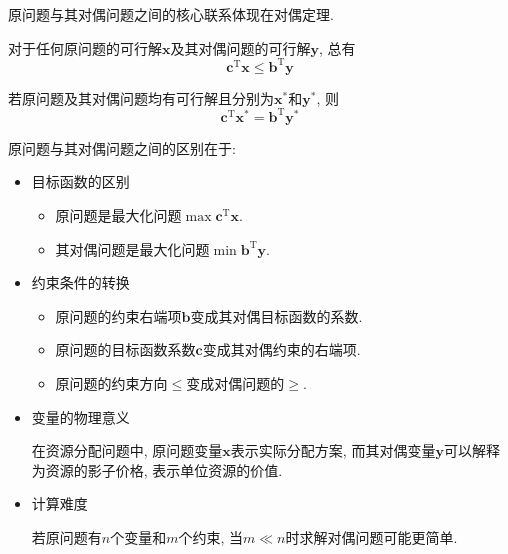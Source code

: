 原问题与其对偶问题之间的核心联系体现在对偶定理.

\begin{theorem}[弱对偶定理]
    对于任何原问题的可行解$\bm{x}$及其对偶问题的可行解$\bm{y}$, 总有
    \begin{equation*}
        \bm{c}^\mathrm{T}\bm{x}\leq\bm{b}^\mathrm{T}\bm{y}
    \end{equation*}
\end{theorem}

\begin{theorem}[强对偶定理]
    若原问题及其对偶问题均有可行解且分别为$\bm{x}^*$和$\bm{y}^*$, 则
    \begin{equation*}
        \bm{c}^\mathrm{T}\bm{x}^*=\bm{b}^\mathrm{T}\bm{y}^*
    \end{equation*}
\end{theorem}

原问题与其对偶问题之间的区别在于:
\begin{itemize}
    \item
        目标函数的区别
        \begin{itemize}
            \item 原问题是最大化问题$\max\bm{c}^\mathrm{T}\bm{x}$.
            \item 其对偶问题是最大化问题$\min\bm{b}^\mathrm{T}\bm{y}$.
        \end{itemize}

    \item
        约束条件的转换
        \begin{itemize}
            \item 原问题的约束右端项$\bm{b}$变成其对偶目标函数的系数.
            \item 原问题的目标函数系数$\bm{c}$变成其对偶约束的右端项.
            \item 原问题的约束方向$\leq$变成对偶问题的$\geq$.
        \end{itemize}

    \item 变量的物理意义

        在资源分配问题中, 原问题变量$\bm{x}$表示实际分配方案, 而其对偶变量$\bm{y}$可以解释为资源的影子价格, 表示单位资源的价值.

    \item 计算难度

        若原问题有$n$个变量和$m$个约束, 当$m\ll n$时求解对偶问题可能更简单.
\end{itemize}
